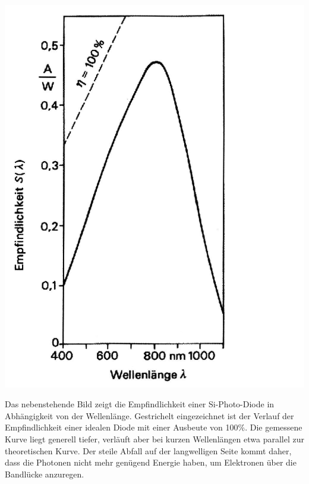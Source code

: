 \begin{minipage}{0.5\textwidth}
	\includegraphics[width=1.00\textwidth]{Versuch_17-18/Abbildungen/QE_Solarzelle.JPG}
	\label{fig:BILD17}
\end{minipage}
\begin{minipage}{0.5\textwidth}
Das nebenstehende Bild zeigt die Empfindlichkeit einer Si-Photo-Diode in Abhängigkeit von der Wellenlänge. Gestrichelt eingezeichnet ist der Verlauf der Empfindlichkeit einer idealen Diode mit einer Ausbeute von 100\%.
Die gemessene Kurve liegt generell tiefer, verläuft aber bei kurzen Wellenlängen etwa parallel zur theoretischen Kurve.
Der steile Abfall auf der langwelligen Seite kommt daher, dass die Photonen nicht mehr genügend Energie haben, um Elektronen über die Bandlücke anzuregen.
\end{minipage}